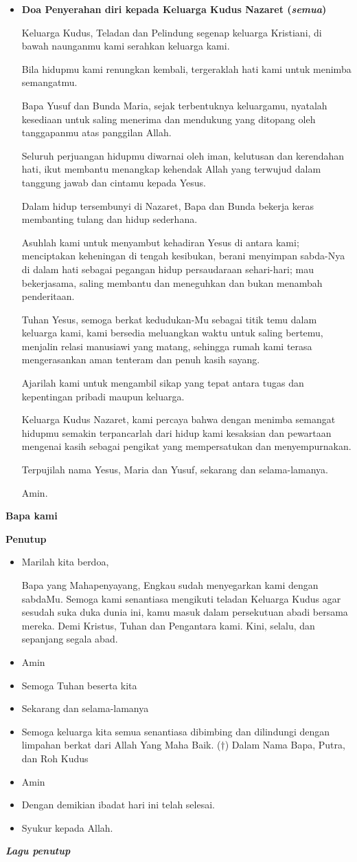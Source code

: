 \documentclass[a5paper,12pt,openany]{scrbook}
\makeatletter
\newcommand{\subjudul}[1]{%
  {\parindent \z@ \normalfont
    \interlinepenalty\@M \bfseries #1\par\nobreak \vskip 20\p@ }}
\newcommand{\lagu}[1]{%
  {\parindent \z@ \normalfont
    \interlinepenalty\@M \bfseries \emph{#1}\par\nobreak \vskip 20\p@ }}
\newcommand{\BU}[1]{\begin{itemize} \item[U:] #1 \end{itemize}}
\newcommand{\BI}[1]{\begin{itemize} \item[P:] #1 \end{itemize}}
\newcommand{\BP}[1]{\begin{itemize} \item[P:] #1 \end{itemize}}
\makeatother
\begin{document}
\BP{\textbf{Doa Penyerahan diri kepada Keluarga Kudus Nazaret (\textit{semua})}

Keluarga Kudus, Teladan dan Pelindung segenap keluarga Kristiani,
di bawah naunganmu kami serahkan keluarga kami.

Bila hidupmu kami renungkan kembali,
tergeraklah hati kami untuk menimba semangatmu.

Bapa Yusuf dan Bunda Maria, sejak terbentuknya keluargamu,
nyatalah kesediaan untuk saling menerima dan mendukung
yang ditopang oleh tanggapanmu atas panggilan Allah.

Seluruh perjuangan hidupmu diwarnai oleh iman, kelutusan dan kerendahan hati,
ikut membantu menangkap kehendak Allah
yang terwujud dalam tanggung jawab dan cintamu kepada Yesus.

Dalam hidup tersembunyi di Nazaret, Bapa dan Bunda bekerja keras
membanting tulang dan hidup sederhana.

Asuhlah kami untuk menyambut kehadiran Yesus di antara kami;
menciptakan keheningan di tengah kesibukan,
berani menyimpan sabda-Nya di dalam hati
sebagai pegangan hidup persaudaraan sehari-hari;
mau bekerjasama, saling membantu dan meneguhkan dan bukan menambah penderitaan.

Tuhan Yesus, semoga berkat kedudukan-Mu sebagai titik temu dalam keluarga kami,
kami bersedia meluangkan waktu untuk saling bertemu,
menjalin relasi manusiawi yang matang,
sehingga rumah kami terasa mengerasankan aman tenteram dan penuh kasih sayang.

Ajarilah kami untuk mengambil sikap yang tepat
antara tugas dan kepentingan pribadi maupun keluarga.

Keluarga Kudus Nazaret, kami percaya bahwa dengan menimba semangat hidupmu
semakin terpancarlah dari hidup kami
kesaksian dan pewartaan mengenai kasih sebagai pengikat
yang mempersatukan dan menyempurnakan.

Terpujilah nama Yesus, Maria dan Yusuf,
sekarang dan selama-lamanya.

Amin.}

\subjudul{Bapa kami}

\subjudul{Penutup}
\BI{Marilah kita berdoa,

Bapa yang Mahapenyayang, Engkau sudah menyegarkan kami dengan sabdaMu. Semoga kami senantiasa mengikuti teladan Keluarga Kudus agar sesudah suka duka dunia ini, kamu masuk dalam persekutuan abadi bersama mereka.
Demi Kristus, Tuhan dan Pengantara kami. Kini, selalu, dan sepanjang segala abad.}

\BU{Amin}

\BI{Semoga Tuhan beserta kita}
\BU{Sekarang dan selama-lamanya}
\BI{Semoga keluarga kita semua senantiasa dibimbing dan dilindungi dengan limpahan berkat dari Allah Yang Maha Baik. ($\dagger$) Dalam Nama Bapa, Putra, dan Roh Kudus}
\BU{Amin}
\BI{Dengan demikian ibadat hari ini telah selesai.}
\BU{Syukur kepada Allah.}

\lagu{Lagu penutup}
\end{document}
